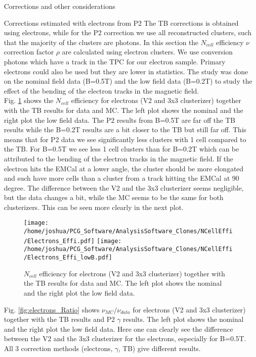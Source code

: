 \documentclass[ALICE]{ALICE_analysis_notes}
\begin{document}
\begin{section}{Corrections and other considerations}
\begin{subsection}{Corrections estimated with electrons from P2}
The TB corrections is obtained using electrons, while for the P2 correction we use all reconstructed clusters, such that the majority of the clusters are photons.
In this section the $N_{cell}$ efficiency $\nu$ correction factor $\rho$ are calculated using electron clusters. We use conversion photons which have a track in the TPC for our electron sample. Primary electrons could also be used but they are lower in statistics. The study was done on the nominal field data (B=0.5T) and the low field data (B=0.2T) to study the effect of the bending of the electron tracks in the magnetic field.\\
Fig. \ref{fig:electrons_Effi} shows the $N_{cell}$ efficiency for electrons (V2 and 3x3 clusterizer) together with the TB results for data and MC. The left plot shows the nominal and the right plot the low field data. The P2 results from B=0.5T are far off the TB results while the B=0.2T results are a bit closer to the TB but still far off. This means that for P2 data we see significantly less clusters with 1 cell compared to the TB. For B=0.5T we see less 1 cell clusters than for B=0.2T which can be attributed to the bending of the electron tracks in the magnetic field. If the electron hits the EMCal at a lower angle, the cluster should be more elongated and such have more cells than a cluster from a track hitting the EMCal at 90 degree.
The difference between the V2 and the 3x3 clusterizer seems negligible, but the data changes a bit, while the MC seems to be the same for both clusterizers. This can be seen more clearly in the next plot.


\begin{figure}[ht!]
	\centering
	\texttt{[image: /home/joshua/PCG\_Software/AnalysisSoftware\_Clones/NCellEffi/Electrons\_Effi.pdf]}	
	\texttt{[image: /home/joshua/PCG\_Software/AnalysisSoftware\_Clones/NCellEffi/Electrons\_Effi\_lowB.pdf]}
	
	\caption{ $N_{cell}$ efficiency for electrons (V2 and 3x3 clusterizer) together with the TB results for data and MC. The left plot shows the nominal and the right plot the low field data.   }
	\label{fig:electrons_Effi}
\end{figure}


Fig. \ref{fig:electrons_Ratio} shows $\nu_{MC}/\nu_{data}$ for electrons (V2 and 3x3 clusterizer) together with the TB results and P2 $\gamma$ results. The left plot shows the nominal and the right plot the low field data.
Here one can clearly see the difference between the V2 and the 3x3 clusterizer for the electrons, especially for B=0.5T. All 3 correction methods (electrons, $\gamma$, TB) give different results.



\end{subsection}
\end{section}
\end{document}
